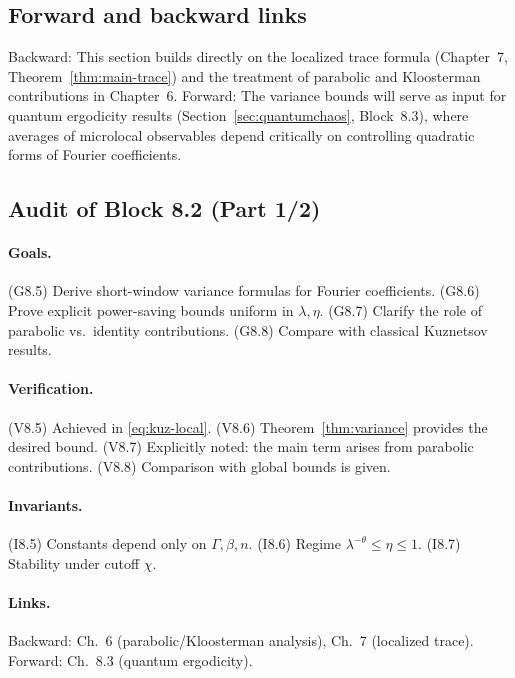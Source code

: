 \subsection{Forward and backward links}
Backward: This section builds directly on the localized trace formula (Chapter~7, Theorem~\ref{thm:main-trace}) and the treatment of parabolic and Kloosterman contributions in Chapter~6. Forward: The variance bounds will serve as input for quantum ergodicity results (Section~\ref{sec:quantumchaos}, Block~8.3), where averages of microlocal observables depend critically on controlling quadratic forms of Fourier coefficients.

\subsection{Audit of Block 8.2 (Part 1/2)}
\paragraph{Goals.}
(G8.5) Derive short-window variance formulas for Fourier coefficients.  
(G8.6) Prove explicit power-saving bounds uniform in $\lambda,\eta$.  
(G8.7) Clarify the role of parabolic vs.\ identity contributions.  
(G8.8) Compare with classical Kuznetsov results.  

\paragraph{Verification.}
(V8.5) Achieved in \eqref{eq:kuz-local}.  
(V8.6) Theorem~\ref{thm:variance} provides the desired bound.  
(V8.7) Explicitly noted: the main term arises from parabolic contributions.  
(V8.8) Comparison with global bounds is given.

\paragraph{Invariants.}
(I8.5) Constants depend only on $\Gamma,\beta,n$.  
(I8.6) Regime $\lambda^{-\theta}\le \eta\le 1$.  
(I8.7) Stability under cutoff $\chi$.  

\paragraph{Links.}
Backward: Ch.~6 (parabolic/Kloosterman analysis), Ch.~7 (localized trace).  
Forward: Ch.~8.3 (quantum ergodicity).  



